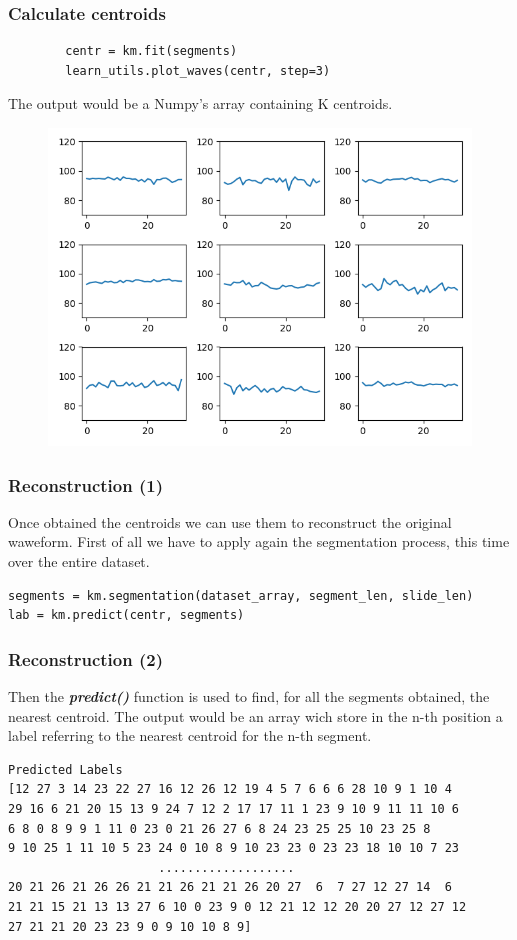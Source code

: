 \documentclass[xcolor ={table,usenames,dvipsnames}]{beamer}
\theoremstyle{definition}
\begin{document}
	\begin{frame}[fragile]
		\frametitle{Calculate centroids}
		\begin{lstlisting}
		centr = km.fit(segments)
		learn_utils.plot_waves(centr, step=3)
		\end{lstlisting}	
		The output would be a Numpy's array containing K centroids. 
		
		\begin{figure}[h!]
			\centering
			\includegraphics[scale=0.35]{img/centroids.png}
		\end{figure}
	\end{frame}

	
	\begin{frame}[fragile]
		\frametitle{Reconstruction (1)}
		Once obtained the centroids we can use them to reconstruct the original waweform. First of all we have to apply again the segmentation process, this time over the entire dataset. 
		
				
		\begin{lstlisting}
segments = km.segmentation(dataset_array, segment_len, slide_len)
lab = km.predict(centr, segments)
		\end{lstlisting}  
	\end{frame}

	\begin{frame}[fragile]
		\frametitle{Reconstruction (2)}
		Then the \textbf{\textit{predict()}} function is used to find, for all the segments obtained, the nearest centroid. The output would be an array wich store in the n-th position a label referring to the nearest centroid for the n-th segment.
		
			\begin{lstlisting}
Predicted Labels
[12 27 3 14 23 22 27 16 12 26 12 19 4 5 7 6 6 6 28 10 9 1 10 4
29 16 6 21 20 15 13 9 24 7 12 2 17 17 11 1 23 9 10 9 11 11 10 6
6 8 0 8 9 9 1 11 0 23 0 21 26 27 6 8 24 23 25 25 10 23 25 8
9 10 25 1 11 10 5 23 24 0 10 8 9 10 23 23 0 23 23 18 10 10 7 23
                     ................... 
20 21 26 21 26 26 21 21 26 21 21 26 20 27  6  7 27 12 27 14  6 
21 21 15 21 13 13 27 6 10 0 23 9 0 12 21 12 12 20 20 27 12 27 12 
27 21 21 20 23 23 9 0 9 10 10 8 9]
		\end{lstlisting}
	\end{frame}
\end{document}
